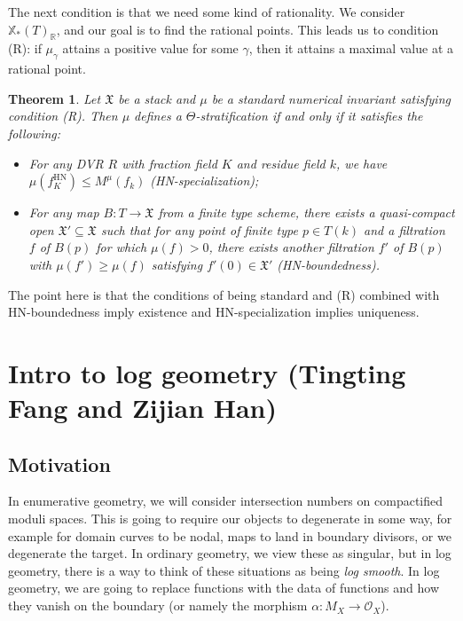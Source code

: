 \documentclass{amsart}
\newtheorem{thm}{Theorem}[section]
\theoremstyle{definition}
\theoremstyle{remark}
\theoremstyle{plain}
\theoremstyle{definition}
\theoremstyle{remark}
\newcommand{\R}{\mathbb{R}}
\newcommand{\mc}[1]{\mathcal{#1}}
\newcommand{\mf}[1]{\mathfrak{#1}}
\newcommand{\mr}[1]{\mathrm{#1}}
\newcommand{\1}{\mathbf{1}}
\newcommand{\2}{\mathbf{2}}
\newcommand{\3}{\mathbf{3}}
\begin{document}
The next condition is that we need some kind of rationality. We consider \(\mathbb{X}_*(T)_{\R}\), and our goal is to find the rational points. This leads us to condition (R): if \(\mu_{\gamma}\) attains a positive value for some \(\gamma\), then it attains a maximal value at a rational point.

\begin{thm}
    Let \(\mf{X}\) be a stack and \(\mu\) be a standard numerical invariant satisfying condition (R). Then \(\mu\) defines a \(\Theta\)-stratification if and only if it satisfies the following:
    \begin{itemize}
        \item For any DVR \(R\) with fraction field \(K\) and residue field \(k\), we have \(\mu(f_K^{\mr{HN}}) \leq M^{\mu}(f_k)\) (HN-specialization);
        \item For any map \(B \colon T \to \mf{X}\) from a finite type scheme, there exists a quasi-compact open \(\mf{X}' \subseteq \mf{X}\) such that for any point of finite type \(p \in T(k)\) and a filtration \(f\) of \(B(p)\) for which \(\mu(f) > 0\), there exists another filtration \(f'\) of \(B(p)\) with \(\mu(f') \geq \mu(f)\) satisfying \(f'(0) \in \mf{X}'\) (HN-boundedness).
    \end{itemize}
\end{thm}

The point here is that the conditions of being standard and (R) combined with HN-boundedness imply existence and HN-specialization implies uniqueness.



\section{Intro to log geometry (Tingting Fang and Zijian Han)}%
\label{sec:Intro to log geometry (Tingting Fang and Zijian Han)}

\subsection{Motivation}%
\label{sub:Motivation}

In enumerative geometry, we will consider intersection numbers on compactified moduli spaces. This is going to require our objects to degenerate in some way, for example for domain curves to be nodal, maps to land in boundary divisors, or we degenerate the target. In ordinary geometry, we view these as singular, but in log geometry, there is a way to think of these situations as being \textit{log smooth}. In log geometry, we are going to replace functions with the data of functions and how they vanish on the boundary (or namely the morphism \(\alpha \colon M_X \to \mc{O}_X\)).
\end{document}
